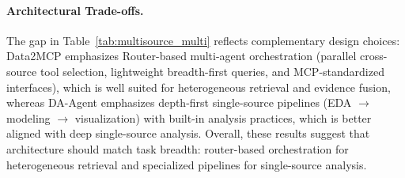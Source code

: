\paragraph{Architectural Trade-offs.}
The gap in Table~\ref{tab:multisource_multi} reflects complementary design choices: Data2MCP emphasizes Router-based multi-agent orchestration (parallel cross-source tool selection, lightweight breadth-first queries, and MCP-standardized interfaces), which is well suited for heterogeneous retrieval and evidence fusion, whereas DA-Agent emphasizes depth-first single-source pipelines (EDA $\to$ modeling $\to$ visualization) with built-in analysis practices, which is better aligned with deep single-source analysis. Overall, these results suggest that architecture should match task breadth: router-based orchestration for heterogeneous retrieval and specialized pipelines for single-source analysis.


